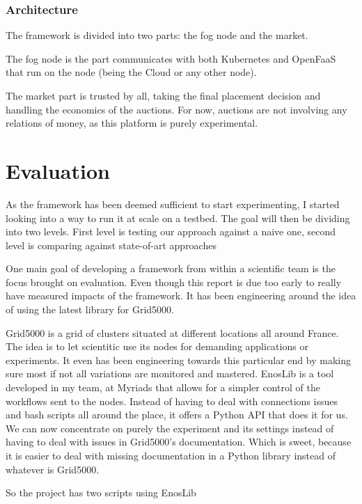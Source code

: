 \documentclass[11pt]{sdm}
\begin{document}
\subsubsection{Architecture}

The framework is divided into two parts: the fog node and the market. 

The fog node is the part communicates with both Kubernetes and OpenFaaS that run on the node (being the Cloud or any other node). 

The market part is trusted by all, taking the final placement decision and handling the economics of the auctions. For now, auctions are not involving any relations of money, as this platform is purely experimental.


\section{Evaluation}

As the framework has been deemed sufficient to start experimenting, I started looking into a way to run it at scale on a testbed. The goal will then be dividing into two levels. First level is testing our approach against a naive one, second level is comparing against state-of-art approaches \cite{bermbach_auctionwhisk_2021, tasiopoulos_fogspot_2019}

One main goal of developing a framework from within a scientific team is the focus brought on evaluation. Even though this report is due too early to really have measured impacts of the framework. It has been engineering around the idea of using the latest library for Grid5000.

Grid5000 is a grid of clusters situated at different locations all around France. The idea is to let scientitic use its nodes for demanding applications or experiments. It even has been engineering towards this particular end by making sure most if not all variations are monitored and mastered. EnosLib is a tool developed in my team, at Myriads that allows for a simpler control of the workflows sent to the nodes. Instead of having to deal with connections issues and bash scripts all around the place, it offers a Python API that does it for us. We can now concentrate on purely the experiment and its settings instead of having to deal with issues in Grid5000's documentation. Which is sweet, because it is easier to deal with missing documentation in a Python library instead of whatever is Grid5000.

So the project has two scripts using EnosLib
\end{document}
